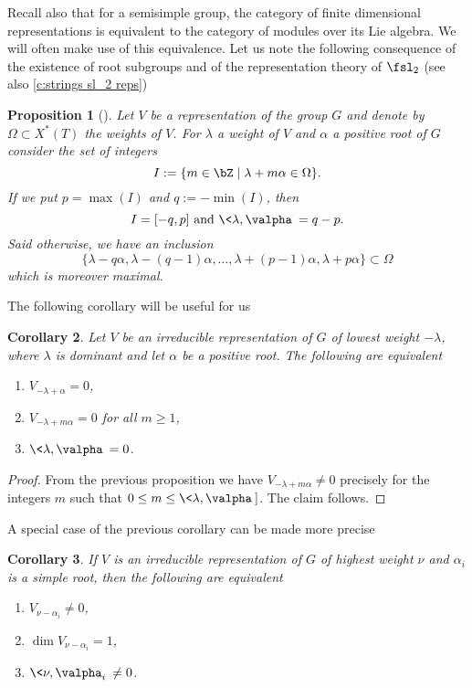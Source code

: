 \documentclass[reqno, 10pt]{amsart}
\theoremstyle{plain}
\newtheorem{proposition}{Proposition}[section]
\newtheorem{corollary}[proposition]{Corollary}
\theoremstyle{definition}
\numberwithin{equation}{section}%
\begin{document}
Recall also that for a semisimple group, the category of finite dimensional representations is equivalent to the category of modules over its Lie algebra. We will often make use of this equivalence.
Let us note the following consequence of the existence of root subgroups and of the representation theory of $\fsl_2$ (see also \cref{c:strings sl_2 reps})
\begin{proposition}[{\cite[Proposition 3, p.124]{Bour78}}]\label{P:action root subgr}
	Let $V$ be a representation of the group $G$ and denote by $\Omega\subset X^*(T)$ the weights of $V$.
	For $\lambda$ a weight of $V$ and $\alpha$ a positive root of $G$ 
	consider the set of integers
	\[ I:=\{m\in\bZ\mid \lambda+m\alpha\in\Omega\}.\]
	If we put $p=\max(I)$ and $q:=-\min(I)$, then
	\[I=[-q,p] \text{ and } \<\lambda,\valpha\> = q-p.\]
	Said otherwise, we have an inclusion
	\[ \{\lambda-q\alpha,\lambda-(q-1)\alpha,\dots,\lambda+(p-1)\alpha,\lambda+p\alpha\}\subset\Omega \]
	which is moreover maximal.

\end{proposition}
The following corollary will be useful for us
\begin{corollary}\label{C:SL2alpha on lowest weight}
	Let $V$ be an irreducible representation of $G$ of lowest weight $-\lambda$, where $\lambda$ is dominant and
	let $\alpha$ be a positive root. 
	The following are equivalent
	\begin{enumerate}
		\item 	$V_{-\lambda+\alpha}=0$, 
		\item $V_{-\lambda+m\alpha}=0$ for all $m\ge 1$,
		\item $\<\lambda, \valpha\>=0$.
	\end{enumerate}
\end{corollary}
\begin{proof}
	From the previous proposition we have $V_{-\lambda+m\alpha}\neq 0$ precisely for the integers $m$ such that $0\le m\le \<\lambda,\valpha\>]$. The claim follows.
\end{proof}

A special case of the previous corollary can be made more precise

\begin{corollary}\label{C:weight space lambda-alpha_i is of dim at most one}
	If $V$ is an irreducible representation of $G$ of highest weight $\nu$ and $\alpha_i$ is a simple root, then the following are equivalent
	\begin{enumerate}
		\item $V_{\nu-\alpha_i} \neq 0$,
		\item $\dim V_{\nu-\alpha_i} = 1$,
		\item $\<\nu,\valpha_i\>\neq 0$.
	\end{enumerate}
\end{corollary}
\end{document}
